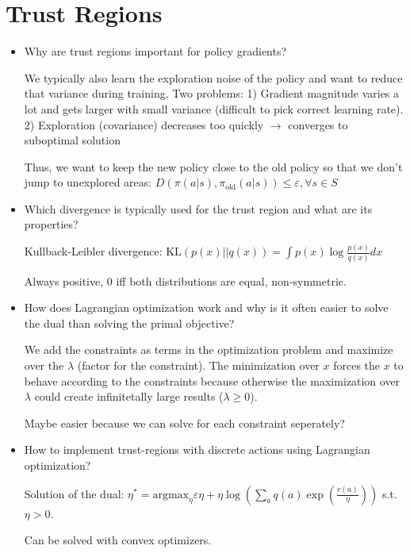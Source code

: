 \documentclass[11pt]{scrartcl}
\begin{document}
\section{Trust Regions}

\begin{itemize}
    \item Why are trust regions important for policy gradients?
    
    We typically also learn the exploration noise of the policy
    and want to reduce that variance during training.
    Two problems: 1) Gradient magnitude varies a lot and gets larger
    with small variance (difficult to pick
    correct learning rate). 2) Exploration (covariance) decreases
    too quickly $\rightarrow$ converges to suboptimal solution

    Thus, we want to keep the new policy close to the old policy
    so that we don't jump to unexplored areas: 
    $D(\pi(a|s), \pi_\textrm{old}(a|s)) \leq \varepsilon, \forall s \in S$

    \item Which divergence is typically used for the trust region and what are its properties?
    
    Kullback-Leibler divergence: $\textrm{KL}(p(x)||q(x)) = 
    \int p(x) \log \frac{p(x)}{q(x)} dx$

    Always positive, 0 iff both distributions are equal, non-symmetric.

    \item How does Lagrangian optimization work and why is it often easier to solve the dual than solving the
    primal objective?

    We add the constraints as terms in the optimization problem
    and maximize over the $\lambda$ (factor for the constraint).
    The minimization over $x$ forces the $x$ to behave according
    to the constraints because otherwise the maximization over
    $\lambda$ could create infinitetally large results 
    ($\lambda \geq 0$).

    Maybe easier because we can solve for each constraint
    seperately?

    \item How to implement trust-regions with discrete actions using Lagrangian optimization?
    
    Solution of the dual: $\eta^* = \textrm{argmax}_\eta 
    \varepsilon \eta + \eta \log(\sum_a q(a) 
    \exp(\frac{r(a)}{\eta})) $ s.t. $\eta > 0$.

    Can be solved with convex optimizers.


\end{itemize}
\end{document}
